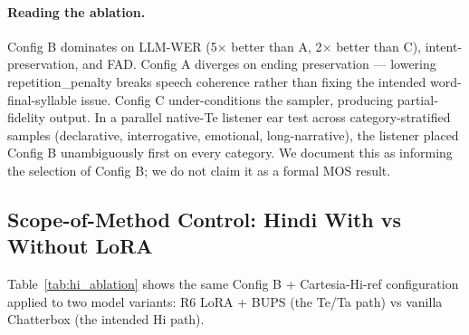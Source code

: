 \documentclass[conference,a4paper]{IEEEtran}
\newcommand{\bups}{\textsc{BUPS}}
\newcommand{\configb}{Config B}
\begin{document}
\paragraph{Reading the ablation.} \configb{} dominates on LLM-WER (5$\times$ better than A, 2$\times$ better than C), intent-preservation, and FAD. Config A diverges on ending preservation --- lowering repetition\_penalty breaks speech coherence rather than fixing the intended word-final-syllable issue. Config C under-conditions the sampler, producing partial-fidelity output. In a parallel native-Te listener ear test across category-stratified samples (declarative, interrogative, emotional, long-narrative), the listener placed \configb{} unambiguously first on every category. We document this as informing the selection of \configb; we do not claim it as a formal MOS result.

\subsection{Scope-of-Method Control: Hindi With vs Without LoRA}
\label{sec:scope_control}

Table~\ref{tab:hi_ablation} shows the same \configb{} + Cartesia-Hi-ref configuration applied to two model variants: R6 LoRA + BUPS (the Te/Ta path) vs vanilla Chatterbox (the intended Hi path).

\begin{table}[t]
\centering
\caption{Hindi scope-of-method ablation: R6 LoRA + BUPS vs vanilla Chatterbox. Both use Cartesia-Hi-female-6s reference + \configb. LoRA branch \emph{regresses} semantic accuracy; vanilla branch recovers commercial-class output. Demonstrates that \bups{} + LoRA's scope is precisely Chatterbox's uncovered Brahmic languages.}
\label{tab:hi_ablation}
\small
{}
\end{table}
\end{document}

